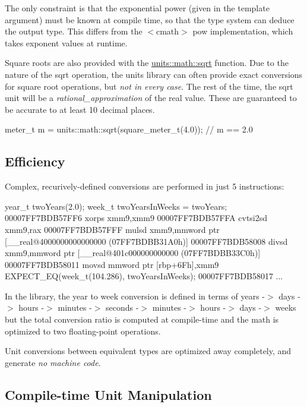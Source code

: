 The only constraint is that the exponential power (given in the template argument) must be known at compile time, so that the type system can deduce the output type. This differs from the {\ttfamily $<$cmath$>$ pow} implementation, which takes exponent values at runtime.

Square roots are also provided with the {\ttfamily \hyperlink{group___unit_math_gabfa4684a203331f788cf8294fdc25c7a}{units\+::math\+::sqrt}} function. Due to the nature of the {\ttfamily sqrt} operation, the units library can often provide exact conversions for square root operations, but {\itshape not in every case}. The rest of the time, the {\ttfamily sqrt} unit will be a {\itshape rational\+\_\+approximation} of the real value. These are guaranteed to be accurate to at least 10 decimal places. \begin{DoxyVerb}meter_t m = units::math::sqrt(square_meter_t(4.0));     // m == 2.0
\end{DoxyVerb}


\subsection*{Efficiency }

Complex, recurively-\/defined conversions are performed in just 5 instructions\+: \begin{DoxyVerb}    year_t twoYears(2.0);
    week_t twoYearsInWeeks = twoYears;
00007FF7BDB57FF6  xorps       xmm9,xmm9  
00007FF7BDB57FFA  cvtsi2sd    xmm9,rax  
00007FF7BDB57FFF  mulsd       xmm9,mmword ptr [__real@4000000000000000 (07FF7BDBB31A0h)]  
00007FF7BDB58008  divsd       xmm9,mmword ptr [__real@401c000000000000 (07FF7BDBB33C0h)]  
00007FF7BDB58011  movsd       mmword ptr [rbp+6Fh],xmm9  
    EXPECT_EQ(week_t(104.286), twoYearsInWeeks);
00007FF7BDB58017  ...
\end{DoxyVerb}


In the library, the year to week conversion is defined in terms of {\ttfamily years -\/$>$ days -\/$>$ hours -\/$>$ minutes -\/$>$ seconds -\/$>$ minutes -\/$>$ hours -\/$>$ days -\/$>$ weeks} but the total conversion ratio is computed at compile-\/time and the math is optimized to two floating-\/point operations.

Unit conversions between equivalent types are optimized away completely, and generate {\itshape no machine code}.

\subsection*{Compile-\/time Unit Manipulation }

